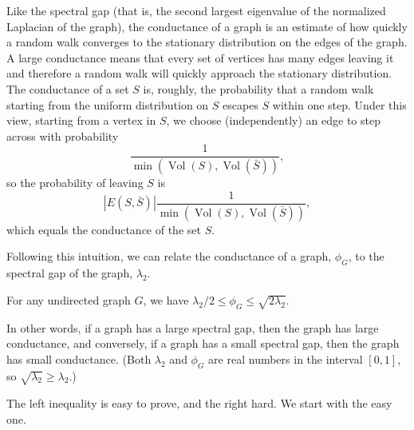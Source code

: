\documentclass[11pt]{article}
\newcommand{\1}{\mathbf{1}}
\newcommand{\0}{\mathbf{0}}
\DeclareMathOperator*{\Vol}{Vol}
\begin{document}
Like the spectral gap (that is, the second largest eigenvalue of the normalized Laplacian of the graph), the conductance of a graph is an estimate of how quickly a random walk converges to the stationary distribution on the edges of the graph.
A large conductance means that every set of vertices has many edges leaving it and therefore a random walk will quickly approach the stationary distribution.
The conductance of a set $S$ is, roughly, the probability that a random walk starting from the uniform distribution on $S$ escapes $S$ within one step.
Under this view, starting from a vertex in $S$, we choose (independently) an edge to step across with probability
\begin{equation*}
  \frac{1}{\min(\Vol(S), \Vol(\bar{S}))},
\end{equation*}
so the probability of leaving $S$ is
\begin{equation*}
  |E(S, \bar{S})| \frac{1}{\min(\Vol(S), \Vol(\bar{S}))},
\end{equation*}
which equals the conductance of the set $S$.

Following this intuition, we can relate the conductance of a graph, $\phi_G$, to the spectral gap of the graph, $\lambda_2$.

\begin{theorem}
  For any undirected graph $G$, we have $\lambda_2 / 2 \leq \phi_G \leq \sqrt{2 \lambda_2}$.
\end{theorem}

In other words, if a graph has a large spectral gap, then the graph has large conductance, and conversely, if a graph has a small spectral gap, then the graph has small conductance.
(Both $\lambda_2$ and $\phi_G$ are real numbers in the interval $[0, 1]$, so $\sqrt{\lambda_2} \geq \lambda_2$.)

The left inequality is easy to prove, and the right hard.
We start with the easy one.
\end{document}
